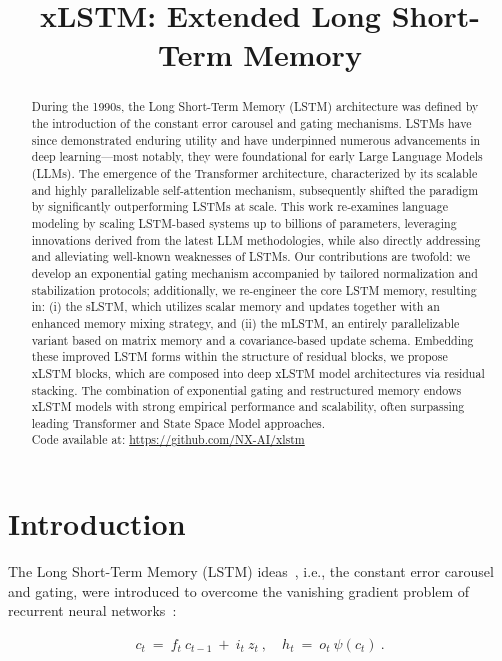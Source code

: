 \title{xLSTM: Extended Long Short-Term Memory}

\begin{abstract}
During the 1990s, the Long Short-Term Memory (LSTM) architecture was defined by the introduction of the constant error carousel and gating mechanisms. LSTMs have since demonstrated enduring utility and have underpinned numerous advancements in deep learning—most notably, they were foundational for early Large Language Models (LLMs). The emergence of the Transformer architecture, characterized by its scalable and highly parallelizable self-attention mechanism, subsequently shifted the paradigm by significantly outperforming LSTMs at scale. This work re-examines language modeling by scaling LSTM-based systems up to billions of parameters, leveraging innovations derived from the latest LLM methodologies, while also directly addressing and alleviating well-known weaknesses of LSTMs. Our contributions are twofold: we develop an exponential gating mechanism accompanied by tailored normalization and stabilization protocols; additionally, we re-engineer the core LSTM memory, resulting in: (i) the sLSTM, which utilizes scalar memory and updates together with an enhanced memory mixing strategy, and (ii) the mLSTM, an entirely parallelizable variant based on matrix memory and a covariance-based update schema. Embedding these improved LSTM forms within the structure of residual blocks, we propose xLSTM blocks, which are composed into deep xLSTM model architectures via residual stacking. The combination of exponential gating and restructured memory endows xLSTM models with strong empirical performance and scalability, often surpassing leading Transformer and State Space Model approaches.\\
Code available at: \url{https://github.com/NX-AI/xlstm}
\end{abstract}

\section{Introduction}
\label{sec:intro}

The Long Short-Term Memory (LSTM) ideas~\citep{Hochreiter:91,Hochreiter:97nips,Hochreiter:97}, i.e., the constant error carousel and gating, were introduced to overcome the vanishing gradient problem of recurrent neural networks~\citep{Hochreiter:91,Hochreiter:00book}:

\begin{align}
\label{eq:lstm_idea}
  c_t \ = \ f_t \ c_{t-1} \ + \ 
          i_t \  z_t \ , \quad  
          h_t \ = \ o_t \ \psi({c_t}) \ . 
\end{align}

